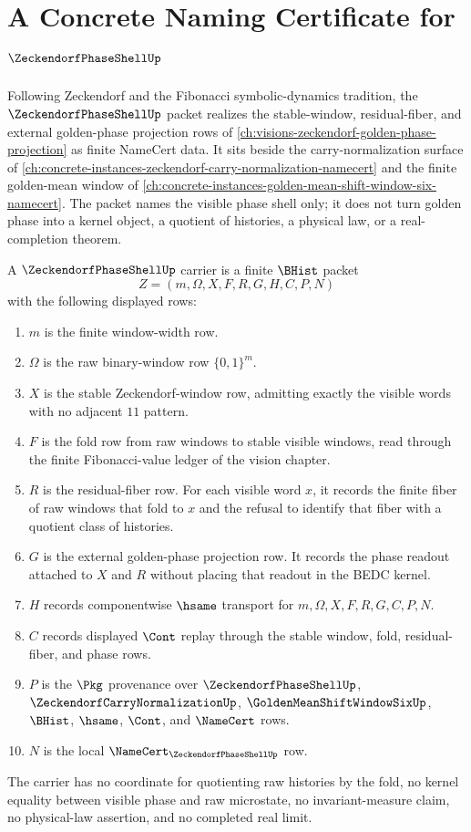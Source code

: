 \chapter{A Concrete Naming Certificate for $\ZeckendorfPhaseShellUp$}
\label{ch:concrete-instances-zeckendorf-phase-shell-namecert}

Following Zeckendorf and the Fibonacci symbolic-dynamics tradition, the $\ZeckendorfPhaseShellUp$ packet realizes the stable-window, residual-fiber, and external golden-phase projection rows of \autoref{ch:visions-zeckendorf-golden-phase-projection} as finite NameCert data. It sits beside the carry-normalization surface of \autoref{ch:concrete-instances-zeckendorf-carry-normalization-namecert} and the finite golden-mean window of \autoref{ch:concrete-instances-golden-mean-shift-window-six-namecert}. The packet names the visible phase shell only; it does not turn golden phase into a kernel object, a quotient of histories, a physical law, or a real-completion theorem.

\begin{definition}
\label{def:zeckendorf-phase-shell-carrier}
A $\ZeckendorfPhaseShellUp$ carrier is a finite $\BHist$ packet
$$
Z=(m,\Omega,X,F,R,G,H,C,P,N)
$$
with the following displayed rows:
\begin{enumerate}
\item $m$ is the finite window-width row.
\item $\Omega$ is the raw binary-window row $\{0,1\}^{m}$.
\item $X$ is the stable Zeckendorf-window row, admitting exactly the visible words with no adjacent $11$ pattern.
\item $F$ is the fold row from raw windows to stable visible windows, read through the finite Fibonacci-value ledger of the vision chapter.
\item $R$ is the residual-fiber row. For each visible word $x$, it records the finite fiber of raw windows that fold to $x$ and the refusal to identify that fiber with a quotient class of histories.
\item $G$ is the external golden-phase projection row. It records the phase readout attached to $X$ and $R$ without placing that readout in the BEDC kernel.
\item $H$ records componentwise $\hsame$ transport for $m,\Omega,X,F,R,G,C,P,N$.
\item $C$ records displayed $\Cont$ replay through the stable window, fold, residual-fiber, and phase rows.
\item $P$ is the $\Pkg$ provenance over $\ZeckendorfPhaseShellUp$, $\ZeckendorfCarryNormalizationUp$, $\GoldenMeanShiftWindowSixUp$, $\BHist$, $\hsame$, $\Cont$, and $\NameCert$ rows.
\item $N$ is the local $\NameCert_{\ZeckendorfPhaseShellUp}$ row.
\end{enumerate}
The carrier has no coordinate for quotienting raw histories by the fold, no kernel equality between visible phase and raw microstate, no invariant-measure claim, no physical-law assertion, and no completed real limit.
\end{definition}

